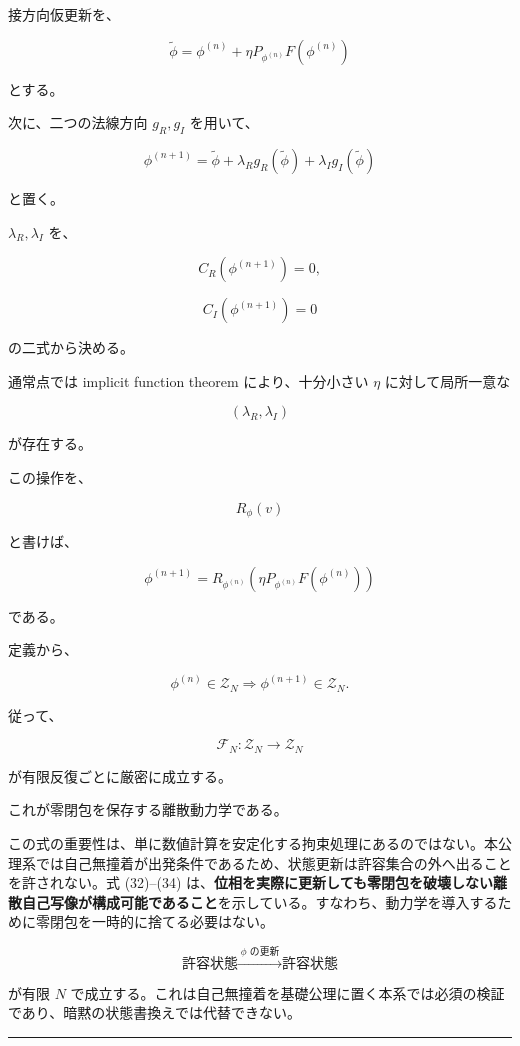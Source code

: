 \documentclass[
  a4paper,
]{ltjsarticle}
\begin{document}
接方向仮更新を、

\[
\widetilde\phi
=
\phi^{(n)}
+
\eta
P_{\phi^{(n)}}F(\phi^{(n)})
\tag{29}
\]

とする。

次に、二つの法線方向 \(g_R,g_I\) を用いて、

\[
\phi^{(n+1)}
=
\widetilde\phi
+
\lambda_Rg_R(\widetilde\phi)
+
\lambda_Ig_I(\widetilde\phi)
\tag{30}
\]

と置く。

\(\lambda_R,\lambda_I\) を、

\[
C_R(\phi^{(n+1)})=0,
\]

\[
C_I(\phi^{(n+1)})=0
\tag{31}
\]

の二式から決める。

通常点では implicit function theorem により、十分小さい \(\eta\)
に対して局所一意な

\[
(\lambda_R,\lambda_I)
\]

が存在する。

この操作を、

\[
R_\phi(v)
\]

と書けば、

\[
\boxed{
\phi^{(n+1)}
=
R_{\phi^{(n)}}
\left(
\eta
P_{\phi^{(n)}}F(\phi^{(n)})
\right)
}
\tag{32}
\]

である。

定義から、

\[
\boxed{
\phi^{(n)}\in\mathcal Z_N
\Longrightarrow
\phi^{(n+1)}\in\mathcal Z_N.
}
\tag{33}
\]

従って、

\[
\boxed{
\mathcal F_N:
\mathcal Z_N
\to
\mathcal Z_N
}
\tag{34}
\]

が有限反復ごとに厳密に成立する。

これが零閉包を保存する離散動力学である。

この式の重要性は、単に数値計算を安定化する拘束処理にあるのではない。本公理系では自己無撞着が出発条件であるため、状態更新は許容集合の外へ出ることを許されない。式
(32)--(34)
は、\textbf{位相を実際に更新しても零閉包を破壊しない離散自己写像が構成可能であること}を示している。すなわち、動力学を導入するために零閉包を一時的に捨てる必要はない。

\[
\boxed{
\text{許容状態}
\xrightarrow{\;\phi\text{ の更新}\;}
\text{許容状態}
}
\]

が有限 \(N\)
で成立する。これは自己無撞着を基礎公理に置く本系では必須の検証であり、暗黙の状態書換えでは代替できない。

\begin{center}\rule{0.5\linewidth}{0.5pt}\end{center}
\end{document}

